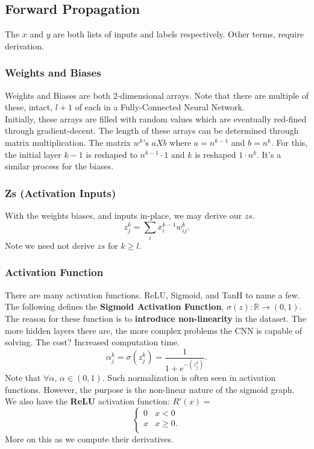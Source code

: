 \documentclass[11pt,letterpaper]{amsbook}
\theoremstyle{definition}
\numberwithin{definition}{chapter}
\numberwithin{exercise}{chapter}
\numberwithin{section}{chapter}
\newcommand{\ds}{\displaystyle}
\begin{document}
\subsection{Forward Propagation}
The $x$ and $y$ are both lists of inputs and labels respectively. Other terms, require derivation. \vspace{2em}
\subsubsection{Weights and Biases}
Weights and Biases are both 2-dimensional arrays. Note that there are multiple of these, intact, $l+1$ of each in a Fully-Connected Neural Network. \\
Initially, these arrays are filled with random values which are eventually red-fined through gradient-decent. The length of these arrays can be determined through matrix multiplication. The matrix $w^k$'s $a X b$ where $a = n^{k-1}$ and $b = n^k$. For this, the initial layer $k-1$ is reshaped to $n^{k-1} \cdot 1$ and $k$ is reshaped $1 \cdot n^k$. It's a similar process for the biases.
\vspace{2em}
\subsubsection{Zs (Activation Inputs)}
With the weights biases, and inputs in-place, we may derive our $zs$. 
\begin{equation}
    z^k_j = \sum_i x^{k-1}_i w^k_{ij}.
\end{equation}
Note we need not derive $zs$ for $k \ge l$.
\subsubsection{Activation Function}
There are many activation functions. ReLU, Sigmoid, and TanH to name a few. The following defines the \textbf{Sigmoid Activation Function}, $\ds \sigma(z) : \mathbb{R} \to (0, 1)$. The reason for these function is to \textbf{introduce non-linearity} in the dataset. The more hidden layers there are, the more complex problems the CNN is capable of solving. The cost? Increased computation time.
\begin{equation}
    \alpha^k_j = \sigma(z^k_j) = \frac{1}{1+e^{-(z^k_j)}}.
\end{equation} 
Note that $\forall \alpha$, $\alpha \in (0, 1)$. Such normalization is often seen in activation functions. However, the purpose is the non-linear nature of the sigmoid graph. 
\\
We also have the \textbf{ReLU} activation function:
$R'(x) = $
\[ \begin{cases} 
      0 & x< 0 \\
      x &  x\geq 0. \\
   \end{cases}
\]
More on this as we compute their derivatives.
\vspace{2em}
\end{document}
